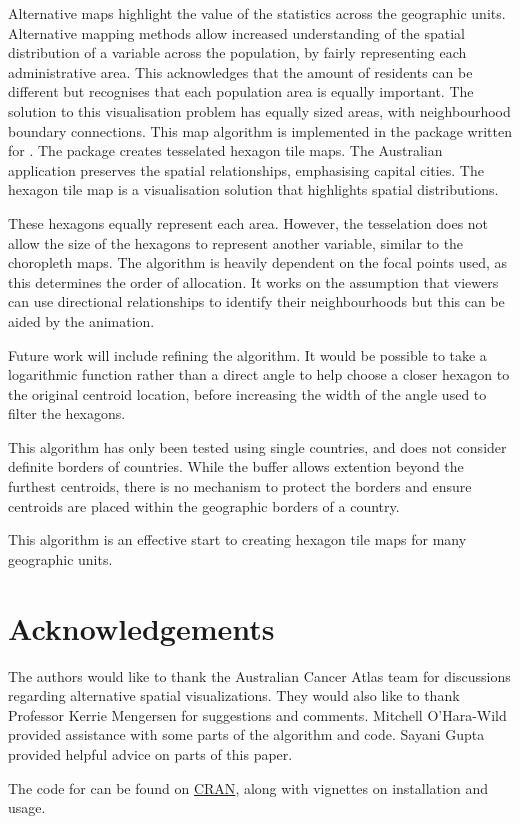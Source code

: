 \documentclass[
]{jss}
\begin{document}
Alternative maps highlight the value of the statistics across the
geographic units. Alternative mapping methods allow increased
understanding of the spatial distribution of a variable across the
population, by fairly representing each administrative area. This
acknowledges that the amount of residents can be different but
recognises that each population area is equally important. The solution
to this visualisation problem has equally sized areas, with
neighbourhood boundary connections. This map algorithm is implemented in
the  \citet{sugarbag} package written for 
\citet{R}. The  package creates tesselated hexagon tile
maps. The Australian application preserves the spatial relationships,
emphasising capital cities. The hexagon tile map is a visualisation
solution that highlights spatial distributions.

These hexagons equally represent each area. However, the tesselation
does not allow the size of the hexagons to represent another variable,
similar to the choropleth maps. The algorithm is heavily dependent on
the focal points used, as this determines the order of allocation. It
works on the assumption that viewers can use directional relationships
to identify their neighbourhoods but this can be aided by the animation.

Future work will include refining the algorithm. It would be possible to
take a logarithmic function rather than a direct angle to help choose a
closer hexagon to the original centroid location, before increasing the
width of the angle used to filter the hexagons.

This algorithm has only been tested using single countries, and does not
consider definite borders of countries. While the buffer allows
extention beyond the furthest centroids, there is no mechanism to
protect the borders and ensure centroids are placed within the
geographic borders of a country.

This algorithm is an effective start to creating hexagon tile maps for
many geographic units.

\hypertarget{acknowledgements}{%
\section{Acknowledgements}\label{acknowledgements}}

The authors would like to thank the Australian Cancer Atlas team for
discussions regarding alternative spatial visualizations. They would
also like to thank Professor Kerrie Mengersen for suggestions and
comments. Mitchell O'Hara-Wild provided assistance with some parts of
the algorithm and code. Sayani Gupta provided helpful advice on parts of
this paper.

The code for  \citep{sugarbag} can be found on
\href{https://cran.r-project.org/web/packages/sugarbag/index.html}{CRAN},
along with vignettes on installation and usage.


\end{document}
